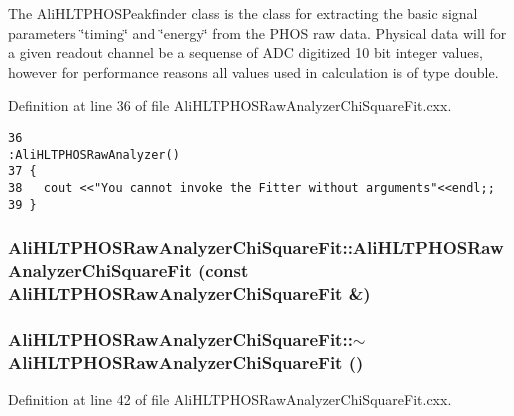 The Ali\-HLTPHOSPeakfinder class is the class for extracting the basic signal parameters \char`\"{}timing\char`\"{} and \char`\"{}energy\char`\"{} from the PHOS raw data. Physical data will for a given readout channel be a sequense of ADC digitized 10 bit integer values, however for performance reasons all values used in calculation is of type double. 

Definition at line 36 of file Ali\-HLTPHOSRaw\-Analyzer\-Chi\-Square\-Fit.cxx.

\footnotesize\begin{verbatim}36                                                                     :AliHLTPHOSRawAnalyzer()
37 {
38   cout <<"You cannot invoke the Fitter without arguments"<<endl;;
39 }
\end{verbatim}\normalsize 


\subsubsection{\setlength{\rightskip}{0pt plus 5cm}Ali\-HLTPHOSRaw\-Analyzer\-Chi\-Square\-Fit::Ali\-HLTPHOSRaw\-Analyzer\-Chi\-Square\-Fit (const {\bf Ali\-HLTPHOSRaw\-Analyzer\-Chi\-Square\-Fit} \&)}\label{classAliHLTPHOSRawAnalyzerChiSquareFit_a1}


\subsubsection{\setlength{\rightskip}{0pt plus 5cm}Ali\-HLTPHOSRaw\-Analyzer\-Chi\-Square\-Fit::$\sim${\bf Ali\-HLTPHOSRaw\-Analyzer\-Chi\-Square\-Fit} ()\hspace{0.3cm}{\tt  [virtual]}}\label{classAliHLTPHOSRawAnalyzerChiSquareFit_a3}




Definition at line 42 of file Ali\-HLTPHOSRaw\-Analyzer\-Chi\-Square\-Fit.cxx.

